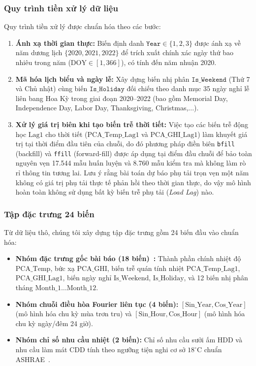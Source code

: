 \subsubsection{Quy trình tiền xử lý dữ liệu}
Quy trình tiền xử lý được chuẩn hóa theo các bước:
\begin{enumerate}
    \item \textbf{Ánh xạ thời gian thực:} Biến định danh $\texttt{Year} \in \{1, 2, 3\}$ được ánh xạ về năm dương lịch $\{2020, 2021, 2022\}$ để trích xuất chính xác ngày thứ bao nhiêu trong năm ($\text{DOY} \in [1, 366]$), có tính đến năm nhuận 2020.
    \item \textbf{Mã hóa lịch biểu và ngày lễ:} Xây dựng biến nhị phân $\texttt{Is\_Weekend}$ (Thứ 7 và Chủ nhật) cùng biến $\texttt{Is\_Holiday}$ đối chiếu theo danh mục 35 ngày nghỉ lễ liên bang Hoa Kỳ trong giai đoạn 2020--2022 (bao gồm Memorial Day, Independence Day, Labor Day, Thanksgiving, Christmas,...).
    \item \textbf{Xử lý giá trị biên khi tạo biến trễ thời tiết:} Việc tạo các biến trễ động học $\text{Lag1}$ cho thời tiết ($\text{PCA\_Temp\_Lag1}$ và $\text{PCA\_GHI\_Lag1}$) làm khuyết giá trị tại thời điểm đầu tiên của chuỗi, do đó phương pháp điền biên \texttt{bfill} (backfill) và \texttt{ffill} (forward-fill) được áp dụng tại điểm đầu chuỗi để bảo toàn nguyên vẹn 17.544 mẫu huấn luyện và 8.760 mẫu kiểm tra mà không làm rò rỉ thông tin tương lai. Lưu ý rằng bài toán dự báo phụ tải trọn vẹn một năm không có giá trị phụ tải thực tế phản hồi theo thời gian thực, do vậy mô hình hoàn toàn không sử dụng bất kỳ biến trễ phụ tải (\textit{Load Lag}) nào.
\end{enumerate}

\subsubsection{Tập đặc trưng 24 biến}
\label{subsubsec:feature_space}
Từ dữ liệu thô, chúng tôi xây dựng tập đặc trưng gồm 24 biến đầu vào chuẩn hóa:
\begin{itemize}
    \item \textbf{Nhóm đặc trưng gốc bài báo (18 biến)~\cite{roy2025hourly}:} Thành phần chính nhiệt độ $\text{PCA\_Temp}$, bức xạ $\text{PCA\_GHI}$, biến trễ quán tính nhiệt $\text{PCA\_Temp\_Lag1}$, $\text{PCA\_GHI\_Lag1}$, biến ngày nghỉ $\text{Is\_Weekend}$, $\text{Is\_Holiday}$, và 12 biến nhị phân tháng $\text{Month\_1}\ldots\text{Month\_12}$.
    \item \textbf{Nhóm chuỗi điều hòa Fourier liên tục (4 biến):} $[\text{Sin\_Year}, \text{Cos\_Year}]$ (mô hình hóa chu kỳ mùa trơn tru) và $[\text{Sin\_Hour}, \text{Cos\_Hour}]$ (mô hình hóa chu kỳ ngày/đêm 24 giờ).
    \item \textbf{Nhóm chỉ số nhu cầu nhiệt (2 biến):} Chỉ số nhu cầu sưởi ấm $\text{HDD}$ và nhu cầu làm mát $\text{CDD}$ tính theo ngưỡng tiện nghi cơ sở $18^\circ\text{C}$ chuẩn ASHRAE~\cite{ashrae2021fundamentals, quayle1980heating}.
\end{itemize}

